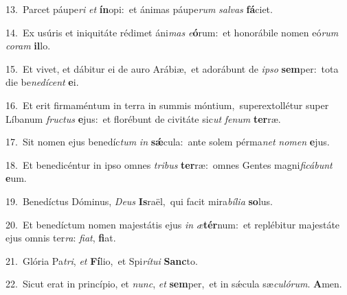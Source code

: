 {\numbfont\textcolor{\numbcolor}{13.}}~Parcet páupe\textit{ri} \textit{et} \textbf{ín}\-opi:~\star et ánimas páupe\textit{rum} \textit{sal}\-\textit{vas} \textbf{fá}\-ciet.\par
{\numbfont\textcolor{\numbcolor}{14.}}~Ex usúris et iniquitáte rédimet áni\textit{mas} \textit{e}\-\textbf{ó}rum:~\star et honorábile nomen eó\textit{rum} \textit{co}\-\textit{ram} \textbf{il}\-lo.\par
{\numbfont\textcolor{\numbcolor}{15.}}~Et vivet, et dábitur ei de auro Arábiæ,~\dagger et adorábunt de \textit{ip}\-\textit{so} \textbf{sem}\-per:~\star tota die be\-\textit{ne}\-\textit{dí}\textit{cent} \textbf{e}\-i.\par
{\numbfont\textcolor{\numbcolor}{16.}}~Et erit firmaméntum in terra in summis móntium,~\dagger superextollétur super Líbanum \textit{fruc}\-\textit{tus} \textbf{e}\-jus:~\star et florébunt de civitáte sic\textit{ut} \textit{fe}\-\textit{num} \textbf{ter}\-ræ.\par
{\numbfont\textcolor{\numbcolor}{17.}}~Sit nomen ejus benedíc\textit{tum} \textit{in} \textbf{sǽ}\-cula:~\star ante solem pérma\textit{net} \textit{no}\-\textit{men} \textbf{e}\-jus.\par
{\numbfont\textcolor{\numbcolor}{18.}}~Et benedicéntur in ipso omnes \textit{tri}\-\textit{bus} \textbf{ter}\-ræ:~\star omnes Gentes magni\-\textit{fi}\-\textit{cá}\textit{bunt} \textbf{e}\-um.\par
{\numbfont\textcolor{\numbcolor}{19.}}~Benedíctus Dóminus, \textit{De}\-\textit{us} \textbf{Is}\-raël,~\star qui facit mira\-\textit{bí}\-\textit{li}\textit{a} \textbf{so}\-lus.\par
{\numbfont\textcolor{\numbcolor}{20.}}~Et benedíctum nomen majestátis ejus \textit{in} \textit{æ}\-\textbf{tér}num:~\star et replébitur majestáte ejus omnis ter\-\textit{ra}\-: \textit{fi}\-\textit{at}, \textbf{fi}\-at.\par
{\numbfont\textcolor{\numbcolor}{21.}}~Glória Pa\-\textit{tri}\-, \textit{et} \textbf{Fí}\-lio,~\star et Spi\-\textit{rí}\-\textit{tu}\textit{i} \textbf{Sanc}\-to.\par
{\numbfont\textcolor{\numbcolor}{22.}}~Sicut erat in princípio, et \textit{nunc}\-, \textit{et} \textbf{sem}\-per,~\star et in sǽcula sæ\-\textit{cu}\-\textit{ló}\textit{rum}. \textbf{A}\-men.\par

